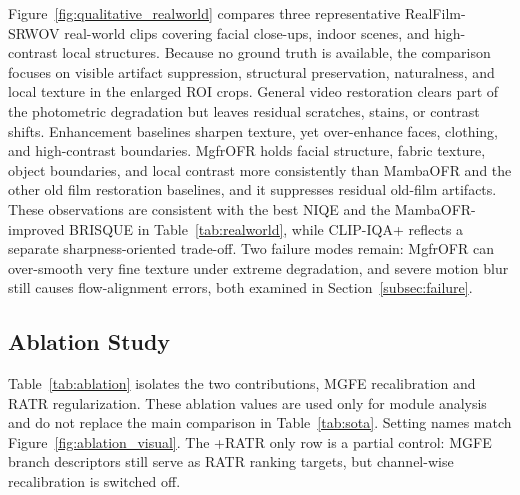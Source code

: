 \documentclass[symmetry,article,submit,pdftex,moreauthors]{Definitions/mdpi}
\begin{document}
Figure~\ref{fig:qualitative_realworld} compares three representative RealFilm-SRWOV real-world clips covering facial close-ups, indoor scenes, and high-contrast local structures. Because no ground truth is available, the comparison focuses on visible artifact suppression, structural preservation, naturalness, and local texture in the enlarged ROI crops. General video restoration clears part of the photometric degradation but leaves residual scratches, stains, or contrast shifts. Enhancement baselines sharpen texture, yet over-enhance faces, clothing, and high-contrast boundaries. MgfrOFR holds facial structure, fabric texture, object boundaries, and local contrast more consistently than MambaOFR and the other old film restoration baselines, and it suppresses residual old-film artifacts. These observations are consistent with the best NIQE and the MambaOFR-improved BRISQUE in Table~\ref{tab:realworld}, while CLIP-IQA+ reflects a separate sharpness-oriented trade-off. Two failure modes remain: MgfrOFR can over-smooth very fine texture under extreme degradation, and severe motion blur still causes flow-alignment errors, both examined in Section~\ref{subsec:failure}.

\FloatBarrier

\subsection{Ablation Study}
\label{subsec:ablation}

Table~\ref{tab:ablation} isolates the two contributions, MGFE recalibration and RATR regularization. These ablation values are used only for module analysis and do not replace the main comparison in Table~\ref{tab:sota}. Setting names match Figure~\ref{fig:ablation_visual}. The +RATR only row is a partial control: MGFE branch descriptors still serve as RATR ranking targets, but channel-wise recalibration is switched off.
\end{document}
